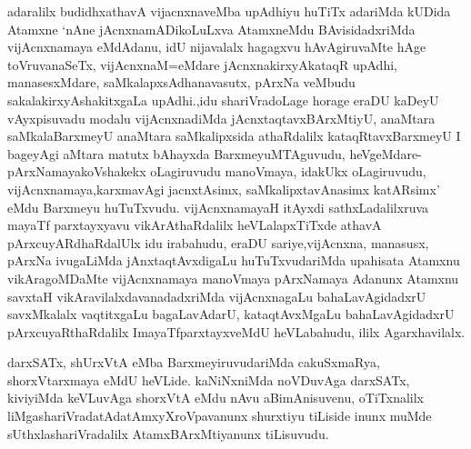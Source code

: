\begin{artha}
adaralilx budidhxathavA vijacnxnaveMba upAdhiyu huTiTx adariMda kUDida Atamxne `nAne jAcnxnamADikoLuLxva AtamxneMdu BAvisidadxriMda vijAcnxnamaya eMdAdanu, idU nijavalalx hagagxvu hAvAgiruvaMte hAge toVruvanaSeTx, vijAcnxnaM=eMdare jAcnxnakirxyAkataqR upAdhi, manasesxMdare, saMkalapxsAdhanavasutx, pArxNa veMbudu sakalakirxyAshakitxgaLa upAdhi.,idu shariVradoLage horage eraDU kaDeyU vAyxpisuvadu modalu vijAcnxnadiMda jAcnxtaqtavxBArxMtiyU, anaMtara saMkalaBarxmeyU anaMtara saMkalipxsida athaRdalilx kataqRtavxBarxmeyU I bageyAgi aMtara matutx bAhayxda BarxmeyuMTAguvudu, heVgeMdare-pArxNamayakoVshakekx oLagiruvudu manoVmaya, idakUkx oLagiruvudu, vijAcnxnamaya,karxmavAgi jacnxtAsimx, saMkalipxtavAnasimx katARsimx' eMdu Barxmeyu huTuTxvudu. vijAcnxnamayaH itAyxdi sathxLadalilxruva mayaTf parxtayxyavu vikArAthaRdalilx heVLalapxTiTxde athavA pArxcuyARdhaRdalUlx idu irabahudu, eraDU sariye,vijAcnxna, manasusx, pArxNa ivugaLiMda jAnxtaqtAvxdigaLu huTuTxvudariMda upahisata Atamxnu vikAragoMDaMte vijAcnxnamaya manoVmaya pArxNamaya Adanunx Atamxnu savxtaH vikAravilalxdavanadadxriMda vijAcnxnagaLu bahaLavAgidadxrU savxMkalalx vaqtitxgaLu bagaLavAdarU, kataqtAvxMgaLu bahaLavAgidadxrU pArxcuyaRthaRdalilx ImayaTfparxtayxveMdU heVLabahudu, ililx Agarxhavilalx.

darxSATx, shUrxVtA eMba BarxmeyiruvudariMda cakuSxmaRya, shorxVtarxmaya eMdU heVLide. kaNiNxniMda noVDuvAga darxSATx, kiviyiMda keVLuvAga shorxVtA eMdu nAvu aBimAnisuvenu, oTiTxnalilx liMgashariVradatAdatAmxyXroVpavanunx shurxtiyu tiLiside inunx muMde sUthxlashariVradalilx AtamxBArxMtiyanunx tiLisuvudu.
\end{artha}

